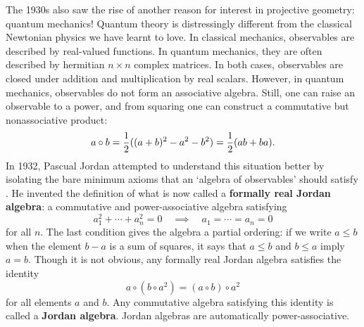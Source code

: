 The 1930s also saw the rise of another reason for interest in projective 
geometry: quantum mechanics!  Quantum theory is distressingly different 
from the classical Newtonian physics we have learnt to love.  In 
classical mechanics, observables are described by real-valued functions. 
In quantum mechanics, they are often described by hermitian $n \times 
n$ complex matrices.   In both cases, observables are closed under 
addition and multiplication by real scalars.  However, in quantum 
mechanics, observables do not form an associative algebra.   Still,  
one can raise an observable to a power, and from squaring one 
can construct a commutative but nonassociative product: 
\[     a \circ b = {1\over 2}((a+b)^2 - a^2 - b^2) 
                  = {1\over 2}(ab + ba) . \] 
In 1932, Pascual Jordan attempted to understand this situation better by 
isolating  the bare minimum axioms that an `algebra of observables' 
should satisfy \cite{Jordan}.  He invented the definition of what is now 
called a {\bf formally real Jordan algebra}: a commutative and 
power-associative algebra satisfying 
\[  a_1^2 + \cdots + a_n^2 = 0 \quad \implies \quad a_1 = \cdots = a_n = 0  \] 
for all $n$.   The last condition gives the algebra a partial 
ordering: if we write $a \le b$ when the element $b - a$ is a sum of 
squares, it says that $a \le b$ and $b \le a$ imply $a = b$.  Though it 
is not obvious, any formally real Jordan algebra satisfies the identity  
\[         a \circ (b \circ a^2) = (a \circ b) \circ a^2 \] 
for all elements $a$ and $b$.   Any commutative algebra satisfying 
this identity is called a {\bf Jordan algebra}.  Jordan algebras are 
automatically power-associative.   
 
